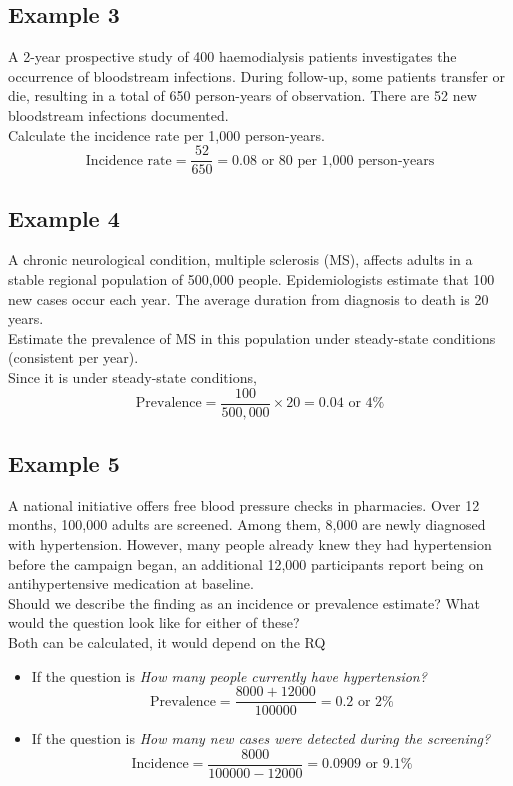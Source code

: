 \documentclass{article}
\begin{document}
\subsection{Example 3}
A 2-year prospective study of 400 haemodialysis patients investigates the occurrence
of bloodstream infections. During follow-up, some patients transfer or die, resulting in a
total of 650 person-years of observation. There are 52 new bloodstream infections
documented.
\\
Calculate the incidence rate per 1,000 person-years.
\\
\begin{equation*}
    \text{Incidence rate} = \dfrac{52}{650} = 0.08 \text{ or 80 per 1,000 person-years}
\end{equation*}

\subsection{Example 4}
A chronic neurological condition, multiple sclerosis (MS), affects adults in a stable
regional population of 500,000 people. Epidemiologists estimate that 100 new cases
occur each year. The average duration from diagnosis to death is 20 years.
\\
Estimate the prevalence of MS in this population under steady-state conditions (consistent per year).
\\
Since it is under steady-state conditions,
\begin{equation*}
    \text{Prevalence} = \dfrac{100}{500,000} \times 20 = 0.04 \text{ or 4\%}
\end{equation*}

\subsection{Example 5}
A national initiative offers free blood pressure checks in pharmacies. Over 12 months,
100,000 adults are screened. Among them, 8,000 are newly diagnosed with
hypertension. However, many people already knew they had hypertension before the
campaign began, an additional 12,000 participants report being on antihypertensive
medication at baseline.
\\
Should we describe the finding as an incidence or prevalence estimate? What would
the question look like for either of these?
\\
Both can be calculated, it would depend on the RQ
\begin{itemize}
    \item If the question is \textit{How many people currently have hypertension?}
        \begin{equation*}
            \text{Prevalence} = \dfrac{8000 + 12000}{100000} = 0.2 \text{ or 2\%}
        \end{equation*}
    \item If the question is \textit{How many new cases were detected during the screening?}
        \begin{equation*}
            \text{Incidence} = \dfrac{8000}{100000 - 12000} = 0.0909 \text{ or 9.1\%}
        \end{equation*}
\end{itemize}
\end{document}
